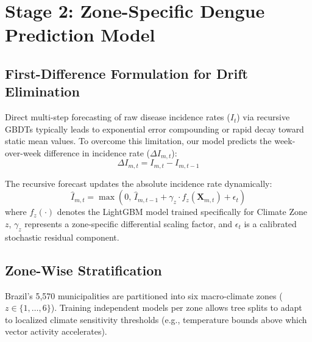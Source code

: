 \documentclass[journal,onecolumn,11pt]{IEEEtran}
\begin{document}
\section{Stage 2: Zone-Specific Dengue Prediction Model}

\subsection{First-Difference Formulation for Drift Elimination}
Direct multi-step forecasting of raw disease incidence rates ($I_t$) via recursive GBDTs typically leads to exponential error compounding or rapid decay toward static mean values. To overcome this limitation, our model predicts the week-over-week difference in incidence rate ($\Delta I_{m,t}$):
\begin{equation}
    \Delta I_{m,t} = I_{m,t} - I_{m,t-1}
\end{equation}

The recursive forecast updates the absolute incidence rate dynamically:
\begin{equation}
    \hat{I}_{m,t} = \max\left( 0, \, \hat{I}_{m,t-1} + \gamma_z \cdot f_z\left( \mathbf{X}_{m,t} \right) + \epsilon_t \right)
\end{equation}
where $f_z(\cdot)$ denotes the LightGBM model trained specifically for Climate Zone $z$, $\gamma_z$ represents a zone-specific differential scaling factor, and $\epsilon_t$ is a calibrated stochastic residual component.

\subsection{Zone-Wise Stratification}
Brazil's 5,570 municipalities are partitioned into six macro-climate zones ($z \in \{1, \dots, 6\}$). Training independent models per zone allows tree splits to adapt to localized climate sensitivity thresholds (e.g., temperature bounds above which vector activity accelerates).
\end{document}
